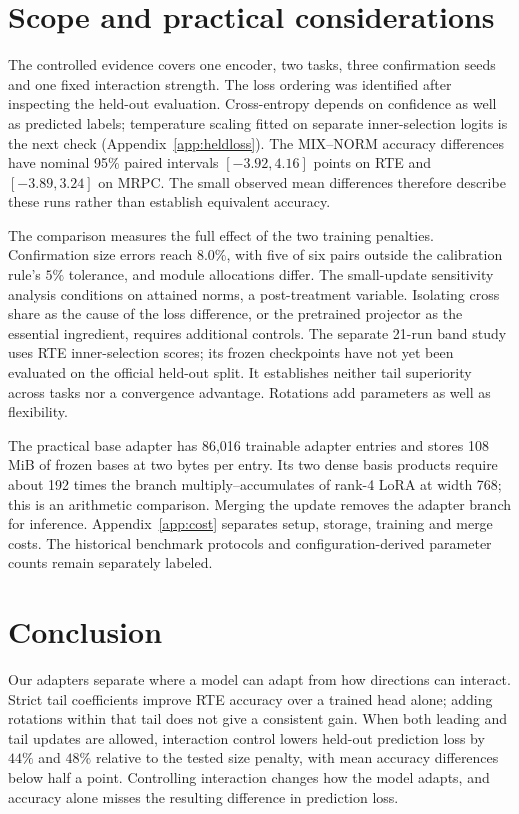 \documentclass{article}
\begin{document}
\section{Scope and practical considerations}
\label{sec:scope}
The controlled evidence covers one encoder, two tasks, three confirmation seeds and one fixed interaction strength. The loss ordering was identified after inspecting the held-out evaluation. Cross-entropy depends on confidence as well as predicted labels; temperature scaling fitted on separate inner-selection logits is the next check (Appendix~\ref{app:heldloss}). The MIX--NORM accuracy differences have nominal 95\% paired intervals $[-3.92,4.16]$ points on RTE and $[-3.89,3.24]$ on MRPC. The small observed mean differences therefore describe these runs rather than establish equivalent accuracy.

The comparison measures the full effect of the two training penalties. Confirmation size errors reach $8.0\%$, with five of six pairs outside the calibration rule's $5\%$ tolerance, and module allocations differ. The small-update sensitivity analysis conditions on attained norms, a post-treatment variable. Isolating cross share as the cause of the loss difference, or the pretrained projector as the essential ingredient, requires additional controls. The separate 21-run band study uses RTE inner-selection scores; its frozen checkpoints have not yet been evaluated on the official held-out split. It establishes neither tail superiority across tasks nor a convergence advantage. Rotations add parameters as well as flexibility.

The practical base adapter has 86{,}016 trainable adapter entries and stores 108 MiB of frozen bases at two bytes per entry. Its two dense basis products require about 192 times the branch multiply--accumulates of rank-4 LoRA at width 768; this is an arithmetic comparison. Merging the update removes the adapter branch for inference. Appendix~\ref{app:cost} separates setup, storage, training and merge costs. The historical benchmark protocols and configuration-derived parameter counts remain separately labeled.

\section{Conclusion}
\label{sec:conclusion}
Our adapters separate where a model can adapt from how directions can interact. Strict tail coefficients improve RTE accuracy over a trained head alone; adding rotations within that tail does not give a consistent gain. When both leading and tail updates are allowed, interaction control lowers held-out prediction loss by $44\%$ and $48\%$ relative to the tested size penalty, with mean accuracy differences below half a point. Controlling interaction changes how the model adapts, and accuracy alone misses the resulting difference in prediction loss.
\end{document}

